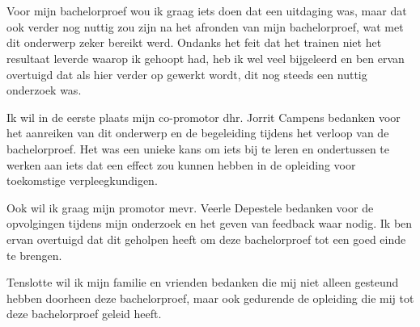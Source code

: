 
\chapter*{}%
\label{ch:voorwoord}


Voor mijn bachelorproef wou ik graag iets doen dat een uitdaging was, maar dat ook verder nog nuttig zou zijn na het afronden van mijn bachelorproef, wat met dit onderwerp zeker bereikt werd. Ondanks het feit dat het trainen niet het resultaat leverde waarop ik gehoopt had, heb ik wel veel bijgeleerd en ben ervan overtuigd dat als hier verder op gewerkt wordt, dit nog steeds een nuttig onderzoek was.

Ik wil in de eerste plaats mijn co-promotor dhr. Jorrit Campens bedanken voor het aanreiken van dit onderwerp en de begeleiding tijdens het verloop van de bachelorproef. Het was een unieke kans om iets bij te leren en ondertussen te werken aan iets dat een effect zou kunnen hebben in de opleiding voor toekomstige verpleegkundigen.

Ook wil ik graag mijn promotor mevr. Veerle Depestele bedanken voor de opvolgingen tijdens mijn onderzoek en het geven van feedback waar nodig. Ik ben ervan overtuigd dat dit geholpen heeft om deze bachelorproef tot een goed einde te brengen.

Tenslotte wil ik mijn familie en vrienden bedanken die mij niet alleen gesteund hebben doorheen deze bachelorproef, maar ook gedurende de opleiding die mij tot deze bachelorproef geleid heeft.
